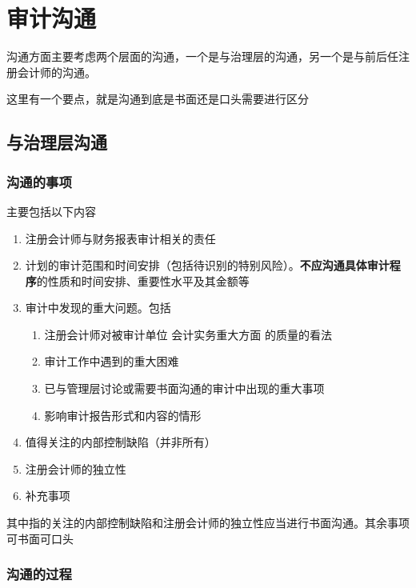 \documentclass[UTF8,12pt]{ctexart}
\numberwithin{equation}{section} %
\numberwithin{figure}{section}
\numberwithin{table}{section}
\begin{document}
	
	\newpage
	\section{审计沟通}
	沟通方面主要考虑两个层面的沟通，一个是与治理层的沟通，另一个是与前后任注册会计师的沟通。
	
	这里有一个要点，就是沟通到底是书面还是口头需要进行区分
	
	\subsection{与治理层沟通}
	
	\subsubsection{沟通的事项}
	主要包括以下内容
	\begin{enumerate}
		\item 注册会计师与财务报表审计相关的责任
		
		\item 计划的审计范围和时间安排（包括待识别的特别风险）。\textbf{不应沟通具体审计程序}的性质和时间安排、重要性水平及其金额等
		
		
		\item 审计中发现的重大问题。包括
		\begin{enumerate}
			\item 注册会计师对被审计单位  会计实务重大方面  的质量的看法
			
			\item 审计工作中遇到的重大困难
			
			
			\item 已与管理层讨论或需要书面沟通的审计中出现的重大事项
			
			\item 影响审计报告形式和内容的情形
		\end{enumerate}
		
		
		\item 值得关注的内部控制缺陷（并非所有）
		
		
		\item 注册会计师的独立性
		
		\item 补充事项
	\end{enumerate}
	其中指的关注的内部控制缺陷和注册会计师的独立性应当进行书面沟通。其余事项可书面可口头
	
	\subsubsection{沟通的过程}
\end{document}
